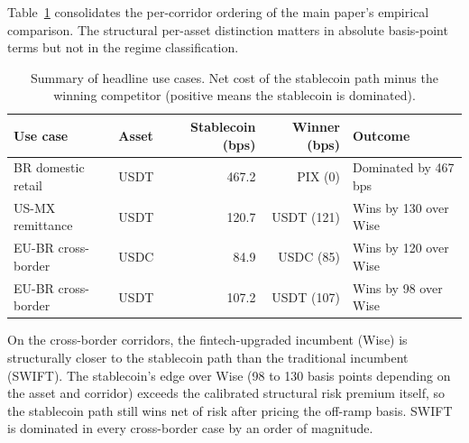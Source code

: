 Table~\ref{tab:summary_uc} consolidates the per-corridor ordering of the main paper's empirical comparison. The structural per-asset distinction matters in absolute basis-point terms but not in the regime classification.

\begin{table}[H]
\centering
\caption{Summary of headline use cases. Net cost of the stablecoin path minus the winning competitor (positive means the stablecoin is dominated).}\label{tab:summary_uc}
\begin{tabular}{llrrl}
\toprule
Use case & Asset & Stablecoin (bps) & Winner (bps) & Outcome \\
\midrule
BR domestic retail    & USDT & 467.2 & PIX (0)          & Dominated by 467 bps \\
US-MX remittance      & USDT & 120.7 & USDT (121)       & Wins by 130 over Wise \\
EU-BR cross-border    & USDC & 84.9  & USDC (85)        & Wins by 120 over Wise \\
EU-BR cross-border    & USDT & 107.2 & USDT (107)       & Wins by 98 over Wise \\
\bottomrule
\end{tabular}
\end{table}

On the cross-border corridors, the fintech-upgraded incumbent (Wise) is structurally closer to the stablecoin path than the traditional incumbent (SWIFT). The stablecoin's edge over Wise (98 to 130 basis points depending on the asset and corridor) exceeds the calibrated structural risk premium itself, so the stablecoin path still wins net of risk after pricing the off-ramp basis. SWIFT is dominated in every cross-border case by an order of magnitude.
